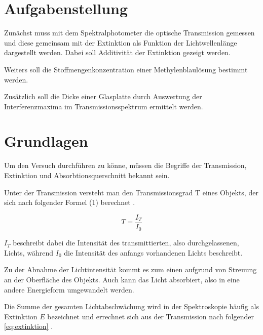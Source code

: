 \documentclass[11pt,ngerman]{scrartcl}
\begin{document}

\tableofcontents
\newpage

\section{Aufgabenstellung\label{Auf0}}

\noindent Zunächst muss mit dem Spektralphotometer die optische Transmission
gemessen und diese gemeinsam mit der Extinktion als Funktion der
Lichtwellenlänge dargestellt werden. Dabei soll Additivität der Extinktion
gezeigt werden.

\vspace{2mm}

\noindent Weiters soll die Stoffmengenkonzentration einer Methylenblaulösung
bestimmt werden.

\vspace{2mm}

\noindent Zusätzlich soll die Dicke einer Glasplatte durch Auswertung der
Interferenzmaxima im Transmissionsspektrum ermittelt werden. \cite{spektovorlage}


\section{Grundlagen}

\noindent Um den Versuch durchführen zu könne, müssen die Begriffe der
Transmission, Extinktion und Absorbtionsquerschnitt bekannt sein.

\vspace{2mm}

\noindent Unter der Transmission versteht man den Transmissionsgrad T eines
Objekts, der sich nach folgender Formel (1) berechnet \cite{spektovorlage}.

\begin{equation}
	T = \frac{I_T}{I_0}
\end{equation}

\noindent $I_T$ beschreibt dabei die Intensität des transmittierten, also
durchgelassenen, Lichts, während $I_0$ die Intensität des anfangs vorhandenen
Lichts beschreibt.

\noindent Zu der Abnahme der Lichtintensität kommt es zum einen aufgrund von
Streuung an der Oberfläche des Objekts. Auch kann das Licht absorbiert, also in
eine andere Energieform umgewandelt werden.

\noindent Die Summe der gesamten Lichtabschwächung wird in der Spektroskopie
häufig als Extinktion $E$ bezeichnet und errechnet sich aus der Transmission
nach folgender \autoref{eq:extinktion} \cite{spektovorlage}.
\end{document}
